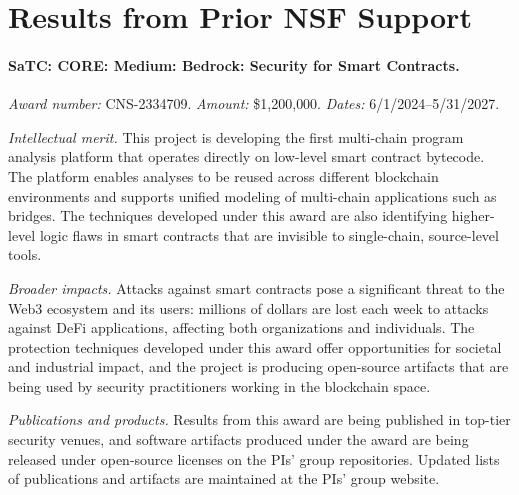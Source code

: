 \section{Results from Prior NSF Support}
\label{sec:prior}

\paragraph{SaTC: CORE: Medium: Bedrock: Security for Smart Contracts.}
\emph{Award number:} CNS-2334709.
\emph{Amount:} \$1{,}200{,}000.
\emph{Dates:} 6/1/2024--5/31/2027.

\emph{Intellectual merit.}
This project is developing the first multi-chain program analysis
platform that operates directly on low-level smart contract bytecode.
The platform enables analyses to be reused across different blockchain
environments and supports unified modeling of multi-chain applications
such as bridges. The techniques developed under this award are also
identifying higher-level logic flaws in smart contracts that are
invisible to single-chain, source-level tools.

\emph{Broader impacts.}
Attacks against smart contracts pose a significant threat to the Web3
ecosystem and its users: millions of dollars are lost each week to
attacks against DeFi applications, affecting both organizations and
individuals. The protection techniques developed under this award
offer opportunities for societal and industrial impact, and the
project is producing open-source artifacts that are being used by
security practitioners working in the blockchain space.

\emph{Publications and products.}
Results from this award are being published in top-tier security
venues, and software artifacts produced under the award are being
released under open-source licenses on the PIs' group repositories.
Updated lists of publications and artifacts are maintained at the PIs'
group website.
